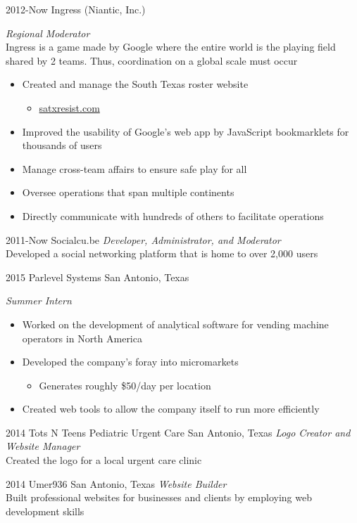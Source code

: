 \documentclass[]{friggeri-cv} %
\begin{document}
\begin{entrylist}
	
	\entry
	{2012-Now}
	{Ingress (Niantic, Inc.)}
	{}
	{\emph{Regional Moderator} \\ 
		Ingress is a game made by Google where the entire world is the playing field shared by 2 teams. Thus, coordination on a global scale must occur 
		\begin{itemize}
			\item Created and manage the South Texas roster website 
			\begin{itemize}
				\item \href{http://satxresist.com}{satxresist.com}
			\end{itemize}
			\item Improved the usability of Google's web app by JavaScript bookmarklets for thousands of users 
			\item Manage cross-team affairs to ensure safe play for all 
			\item Oversee operations that span multiple continents 
			\item Directly communicate with hundreds of others to facilitate operations 
		\end{itemize}
	}
	
	
	\entry
	{2011-Now}
	{Socialcu.be}
	{}
	{\emph{Developer, Administrator, and Moderator} \\
		Developed a social networking platform that is home to over 2,000 users}
	
	
	\entry
	{2015}
	{Parlevel Systems}
	{San Antonio, Texas}
	{\emph{Summer Intern} 
		\begin{itemize}
			\item Worked on the development of analytical software for vending machine operators in North America 
			\item Developed the company's foray into micromarkets 
			\begin{itemize}
				\item Generates roughly \$50/day per location 
			\end{itemize}
			\item Created web tools to allow the company itself to run more efficiently
		\end{itemize}
	}
	
	
	\entry
	{2014}
	{Tots N Teens Pediatric Urgent Care}
	{San Antonio, Texas}
	{\emph{Logo Creator and Website Manager} \\
		Created the logo for a local urgent care clinic}
	
	
	\entry
	{2014}
	{Umer936}
	{San Antonio, Texas}
	{\emph{Website Builder} \\
		Built professional websites for businesses and clients by employing web development skills}
	
	
\end{entrylist}
\end{document}
